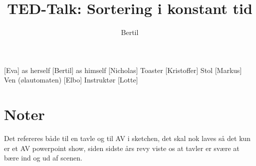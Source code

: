 \documentclass[a4paper,11pt]{article}
\title{TED-Talk: Sortering i konstant tid}
\author{Bertil}
\begin{document}
\maketitle

\begin{roles}
[Eva] as herself
[Bertil] as himself
 [Nicholas] Toaster
 [Kristoffer] Stol
 [Markus] Ven (ølautomaten)
[Elbo] Instruktør
[Lotte]


\end{roles} 

\section*{Noter}
Det refereres både til en tavle og til AV i sketchen, det skal nok laves så det kun er et AV powerpoint show, siden sidste års revy viste os at tavler er svære at bære ind og ud af scenen.

\begin{props}
\end{props}

\end{document}
